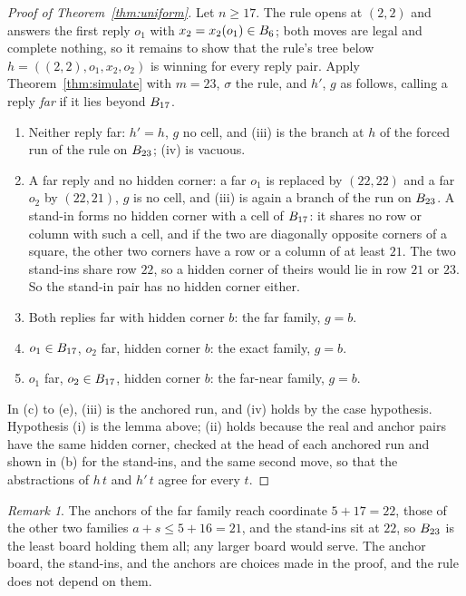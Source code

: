 \documentclass[11pt]{amsart}
\theoremstyle{definition}
\theoremstyle{remark}
\newtheorem{remark}[theorem]{Remark}
\begin{document}
\begin{proof}[Proof of Theorem~\ref{thm:uniform}]
Let $n \ge 17$. The rule opens at $(2,2)$ and answers the first reply
$o_1$ with $x_2 = x_2(o_1) \in B_6$; both moves are legal and
complete nothing, so it remains to show that the rule's tree below
$h = ((2,2), o_1, x_2, o_2)$ is winning for every reply pair. Apply
Theorem~\ref{thm:simulate} with $m = 23$, $\sigma$ the rule, and $h'$,
$g$ as follows, calling a reply \emph{far} if it lies beyond
$B_{17}$.
\begin{enumerate}
\item[(a)] Neither reply far: $h' = h$, $g$ no cell, and (iii) is the
  branch at $h$ of the forced run of the rule on $B_{23}$; (iv) is
  vacuous.
\item[(b)] A far reply and no hidden corner: a far $o_1$ is replaced by
  $(22,22)$ and a far $o_2$ by $(22,21)$, $g$ is no cell, and (iii) is
  again a branch of the run on $B_{23}$. A stand-in forms no hidden
  corner with a cell of $B_{17}$: it shares no row or column with
  such a cell, and if the two are diagonally opposite corners of a
  square, the other two corners have a row or a column of at least
  $21$. The two stand-ins share row $22$, so a hidden corner of theirs
  would lie in row $21$ or $23$. So the stand-in pair has no hidden
  corner either.
\item[(c)] Both replies far with hidden corner $b$: the far family,
  $g = b$.
\item[(d)] $o_1 \in B_{17}$, $o_2$ far, hidden corner $b$: the
  exact family, $g = b$.
\item[(e)] $o_1$ far, $o_2 \in B_{17}$, hidden corner $b$: the
  far-near family, $g = b$.
\end{enumerate}
In (c) to (e), (iii) is the anchored run, and (iv) holds by the case
hypothesis. Hypothesis (i) is the lemma above; (ii) holds because the
real and anchor pairs have the same hidden corner, checked at the head of
each anchored run and shown in (b) for the stand-ins, and the same
second move, so that the abstractions of $h\,t$ and $h'\,t$ agree for
every $t$.
\end{proof}

\begin{remark}\label{rem:anchors}
The anchors of the far family reach coordinate $5 + 17 = 22$, those of
the other two families $a + s \le 5 + 16 = 21$, and the stand-ins sit
at $22$, so $B_{23}$ is the least board holding them all; any
larger board would serve. The anchor board, the stand-ins, and the
anchors are choices made in the proof, and the rule does not depend on
them.
\end{remark}
\end{document}
